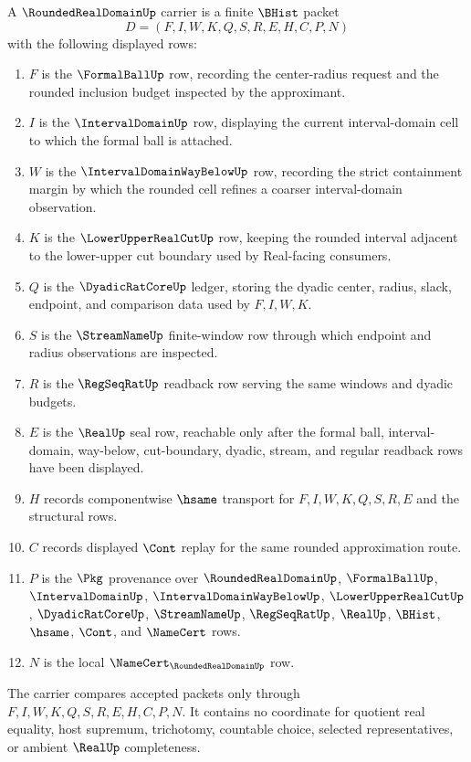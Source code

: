 \begin{definition}
\label{def:rounded-real-domain-carrier}
A $\RoundedRealDomainUp$ carrier is a finite $\BHist$ packet
$$
D=(F,I,W,K,Q,S,R,E,H,C,P,N)
$$
with the following displayed rows:
\begin{enumerate}
\item $F$ is the $\FormalBallUp$ row, recording the center-radius request and the rounded inclusion budget inspected by the approximant.
\item $I$ is the $\IntervalDomainUp$ row, displaying the current interval-domain cell to which the formal ball is attached.
\item $W$ is the $\IntervalDomainWayBelowUp$ row, recording the strict containment margin by which the rounded cell refines a coarser interval-domain observation.
\item $K$ is the $\LowerUpperRealCutUp$ row, keeping the rounded interval adjacent to the lower-upper cut boundary used by Real-facing consumers.
\item $Q$ is the $\DyadicRatCoreUp$ ledger, storing the dyadic center, radius, slack, endpoint, and comparison data used by $F,I,W,K$.
\item $S$ is the $\StreamNameUp$ finite-window row through which endpoint and radius observations are inspected.
\item $R$ is the $\RegSeqRatUp$ readback row serving the same windows and dyadic budgets.
\item $E$ is the $\RealUp$ seal row, reachable only after the formal ball, interval-domain, way-below, cut-boundary, dyadic, stream, and regular readback rows have been displayed.
\item $H$ records componentwise $\hsame$ transport for $F,I,W,K,Q,S,R,E$ and the structural rows.
\item $C$ records displayed $\Cont$ replay for the same rounded approximation route.
\item $P$ is the $\Pkg$ provenance over $\RoundedRealDomainUp$, $\FormalBallUp$, $\IntervalDomainUp$, $\IntervalDomainWayBelowUp$, $\LowerUpperRealCutUp$, $\DyadicRatCoreUp$, $\StreamNameUp$, $\RegSeqRatUp$, $\RealUp$, $\BHist$, $\hsame$, $\Cont$, and $\NameCert$ rows.
\item $N$ is the local $\NameCert_{\RoundedRealDomainUp}$ row.
\end{enumerate}
The carrier compares accepted packets only through $F,I,W,K,Q,S,R,E,H,C,P,N$. It contains no coordinate for quotient real equality, host supremum, trichotomy, countable choice, selected representatives, or ambient $\RealUp$ completeness.
\end{definition}

